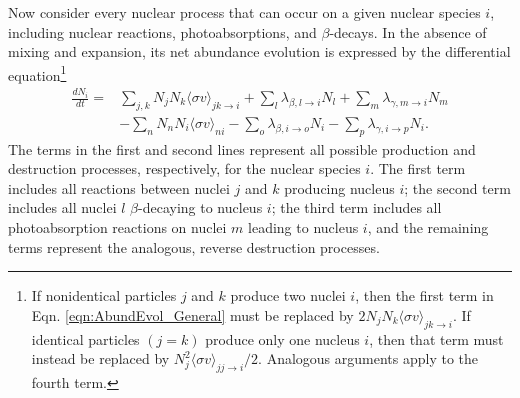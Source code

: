 Now consider every nuclear process that can occur on a given nuclear species $i$, including nuclear reactions, photoabsorptions, and $\beta$-decays. In the absence of mixing and expansion, its net abundance evolution is expressed by the differential equation\footnote{If nonidentical particles $j$ and $k$ produce two nuclei $i$, then the first term in Eqn. \ref{eqn:AbundEvol_General} must be replaced by $2N_{j}N_{k}\langle \sigma v \rangle_{jk \rightarrow i}$. If identical particles $(j = k)$ produce only one nucleus $i$, then that term must instead be replaced by $N_{j}^{2}\langle \sigma v \rangle_{jj \rightarrow i}/2$. Analogous arguments apply to the fourth term.}
\begin{align}
\frac{dN_{i}}{dt} = &\sum_{j,k} N_{j}N_{k} \langle \sigma v \rangle_{jk \rightarrow i} + \sum_{l} \lambda_{\beta, l \rightarrow i} N_{l} + \sum_{m} \lambda_{\gamma, m \rightarrow i} N_{m} \nonumber \\
&- \sum_{n} N_{n}N_{i}\langle \sigma v \rangle_{ni} - \sum_{o} \lambda_{\beta, i \rightarrow o} N_{i} - \sum_{p} \lambda_{\gamma, i \rightarrow p} N_{i}. \label{eqn:AbundEvol_General}
\end{align}
The terms in the first and second lines represent all possible production and destruction processes, respectively, for the nuclear species $i$. The first term includes all reactions between nuclei $j$ and $k$ producing nucleus $i$; the second term includes all nuclei $l$ $\beta$-decaying to nucleus $i$; the third term includes all photoabsorption reactions on nuclei $m$ leading to nucleus $i$, and the remaining terms represent the analogous, reverse destruction processes.

